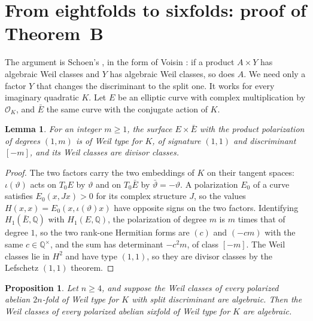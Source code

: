 \documentclass[11pt]{amsart}
\newtheorem{proposition}[theorem]{Proposition}
\newtheorem{lemma}[theorem]{Lemma}
\theoremstyle{definition}
\theoremstyle{remark}
\newcommand{\Q}{\mathbb Q}
\begin{document}
\section{From eightfolds to sixfolds: proof of Theorem~B}\label{sec:compensation}

The argument is Schoen's \cite[Proposition~10]{Schoen98}, in the form of Voisin \cite[Lemme~2.9]{Voisin}: if a product $A\times Y$ has algebraic Weil classes and $Y$ has algebraic Weil classes, so does $A$. We need only a factor $Y$ that changes the discriminant to the split one. It works for every imaginary quadratic $K$. Let $E$ be an elliptic curve with complex multiplication by $\mathcal O_K$, and $\bar E$ the same curve with the conjugate action of $K$.

\begin{lemma}\label{lem:eebar}
For an integer $m\ge1$, the surface $E\times\bar E$ with the product polarization of degrees $(1,m)$ is of Weil type for $K$, of signature $(1,1)$ and discriminant $[-m]$, and its Weil classes are divisor classes.
\end{lemma}

\begin{proof}
The two factors carry the two embeddings of $K$ on their tangent spaces: $\iota(\vartheta)$ acts on $T_0E$ by $\vartheta$ and on $T_0\bar E$ by $\bar\vartheta=-\vartheta$. A polarization $E_0$ of a curve satisfies $E_0(x,Jx)>0$ for its complex structure $J$, so the values $H(x,x)=E_0(x,\iota(\vartheta)x)$ have opposite signs on the two factors. Identifying $H_1(\bar E,\Q)$ with $H_1(E,\Q)$, the polarization of degree $m$ is $m$ times that of degree $1$, so the two rank-one Hermitian forms are $(c)$ and $(-cm)$ with the same $c\in\Q^\times$, and the sum has determinant $-c^2m$, of class $[-m]$. The Weil classes lie in $H^2$ and have type $(1,1)$, so they are divisor classes by the Lefschetz $(1,1)$ theorem.
\end{proof}

\begin{proposition}\label{prop:compensation}
Let $n\ge4$, and suppose the Weil classes of every polarized abelian $2n$-fold of Weil type for $K$ with split discriminant are algebraic. Then the Weil classes of every polarized abelian sixfold of Weil type for $K$ are algebraic.
\end{proposition}
\end{document}
